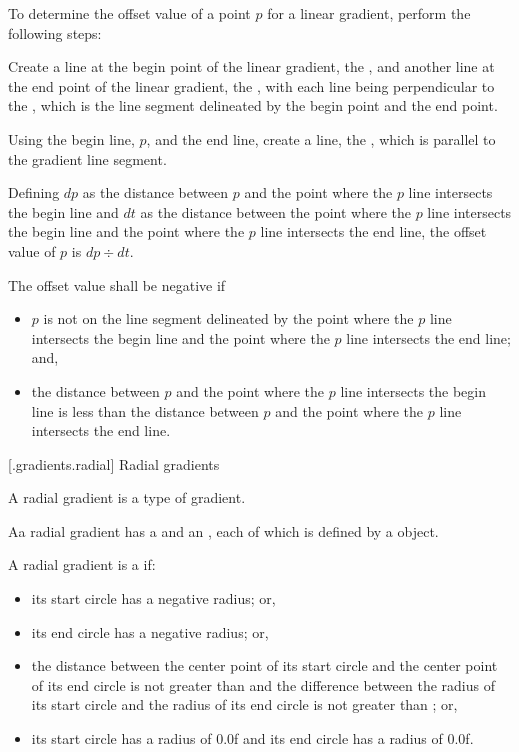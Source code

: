 \pnum
To determine the offset value of a point $p$ for a linear gradient, perform the following steps:
\begin{enumeratea}
\item Create a line at the begin point of the linear gradient, the , and another line at the end point of the linear gradient, the , with each line being perpendicular to the , which is the line segment delineated by the begin point and the end point.

\item Using the begin line, $p$, and the end line, create a line, the , which is parallel to the gradient line segment.

\item Defining $dp$ as the distance between $p$ and the point where the $p$ line intersects the begin line and $dt$ as the distance between the point where the $p$ line intersects the begin line and the point where the $p$ line intersects the end line, the offset value of $p$ is $dp \div dt$.

\item The offset value shall be negative if
\begin{itemize}
\item $p$ is not on the line segment delineated by the point where the $p$ line intersects the begin line and the point where the $p$ line intersects the end line; and,

\item the distance between $p$ and the point where the $p$ line intersects the begin line is less than the distance between $p$ and the point where the $p$ line intersects the end line.
\end{itemize}
\end{enumeratea}

 [\iotwod.gradients.radial] {Radial gradients}

\pnum
A radial gradient is a type of gradient.

\pnum
Aa radial gradient has a  and an , each of which is defined by a  object.

\pnum
A radial gradient is a  if:
\begin{itemize}
\item its start circle has a negative radius; or,
\item its end circle has a negative radius; or,
\item the distance between the center point of its start circle and the center point of its end circle is not greater than  and the difference between the radius of its start circle and the radius of its end circle is not greater than ; or,
\item its start circle has a radius of 0.0f and its end circle has a radius of 0.0f.
\end{itemize}

